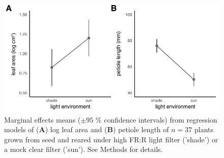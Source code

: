 \documentclass[11pt, oneside]{amsart}
\begin{document}
\begin{figure}[!hptb]
\centering
\includegraphics[scale=0.8]{GHareapetlen}
\caption{Marginal effects means ($\pm 95$ \% confidence intervals) from regression models of (\textbf{A}) log leaf area and (\textbf{B}) petiole length of $n=37$ plants grown from seed and reared under high FR:R light filter ('shade') or a mock clear filter ('sun'). See Methods for details.}
\label{FigS12}
\end{figure}

\newpage
\end{document}

